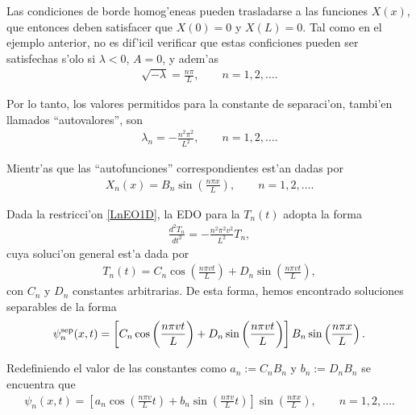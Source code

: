 Las condiciones de borde homog'eneas pueden trasladarse a las funciones $X(x)$, que entonces deben satisfacer que $X(0)=0$ y $X(L)=0$. 
Tal como en el ejemplo anterior, no es dif'icil verificar que estas conficiones pueden ser satisfechas s'olo si $\lambda < 0$, $A=0$, y adem'as 
\begin{align}
\sqrt{-\lambda}=\frac{n\pi}{L},\qquad n=1,2,\dots.
\end{align} 

Por lo tanto, los valores permitidos para la constante de separaci'on, tambi'en llamados ``autovalores'', son
\begin{align}\label{LnEO1D}
\lambda_{n}=-\frac{n^2 \pi^2}{L^2},\qquad n=1,2,\hdots.
\end{align}

Mientr'as que las ``autofunciones'' correspondientes est'an dadas por
\begin{align}
X_{n}(x)=B_n\sin\left(\frac{n \pi x}{L}\right),\qquad n=1,2,\hdots.
\end{align}

Dada la restricci'on \eqref{LnEO1D}, la EDO para la $T_{n}(t)$ adopta la forma
\begin{align}
\frac{d^2 T_{n}}{dt^2}=-\frac{n^2 \pi^2v^2}{L^2}T_{n},
\end{align}
cuya soluci'on general est'a dada por
\begin{align}
T_{n}(t)=C_{n}\cos\left(\frac{n \pi vt}{L}\right)+D_{n}\sin\left(\frac{n\pi vt}{L}\right),
\end{align}
con $C_{n}$ y $D_{n}$ constantes arbitrarias. De esta forma, hemos encontrado soluciones separables de la forma
\begin{align}
\psi^{\rm sep}_n(x,t)=\left[C_{n}\cos\left(\frac{n \pi vt}{L}\right)+D_{n}\sin\left(\frac{n\pi vt}{L}\right) \right]B_{n}\sin\left(\frac{n \pi x}{L}\right).
\end{align}

Redefiniendo el valor de las constantes como $a_{n}:=C_{n}B_{n}$ y $b_{n}:=D_{n}B_{n}$ se encuentra que
\begin{align}
\psi_{n}(x,t)=\left[a_{n}\cos\left(\frac{n \pi v}{L}t\right)+b_{n}\sin\left(\frac{n \pi v}{L}t\right)\right] \sin\left(\frac{n\pi x}{L}\right), \qquad n=1,2,\dots.
\end{align}

